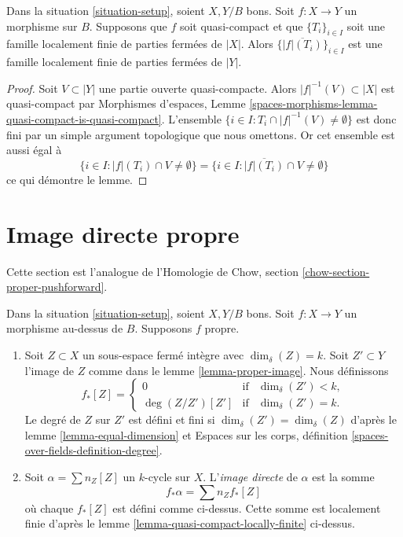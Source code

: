 \begin{lemma}
\label{lemma-quasi-compact-locally-finite}
Dans la situation \ref{situation-setup}, soient $X, Y/B$ bons. Soit $f :
X \to Y$ un morphisme sur $B$. Supposons que $f$ soit quasi-compact et que
$\{T_i\}_{i \in I}$ soit une famille localement finie de parties fermées de
$|X|$. Alors $\{\overline{|f|(T_i)}\}_{i \in I}$ est une famille localement
finie de parties fermées de $|Y|$.
\end{lemma}

\begin{proof}
Soit $V \subset |Y|$ une partie ouverte quasi-compacte. Alors $|f|^{-1}(V)
\subset |X|$ est quasi-compact par Morphismes d'espaces, Lemme
\ref{spaces-morphisms-lemma-quasi-compact-is-quasi-compact}. L’ensemble $\{i
\in I : T_i \cap |f|^{-1}(V) \not = \emptyset \}$ est donc fini par un simple
argument topologique que nous omettons. Or cet ensemble est aussi égal à
$$
\{i \in I : |f|(T_i) \cap V \not = \emptyset \} =
\{i \in I : \overline{|f|(T_i)} \cap V \not = \emptyset \}
$$
ce qui démontre le lemme.
\end{proof}










\section{Image directe propre}
\label{section-proper-pushforward}

\noindent
Cette section est l'analogue de l'Homologie de Chow, section
\ref{chow-section-proper-pushforward}.

\begin{definition}
\label{definition-proper-pushforward}
Dans la situation \ref{situation-setup}, soient $X, Y/B$ bons. Soit $f : X
\to Y$ un morphisme au-dessus de $B$. Supposons $f$ propre.
\begin{enumerate}
\item Soit $Z \subset X$ un sous-espace fermé intègre avec $\dim_\delta(Z) =
k$. Soit $Z' \subset Y$ l'image de $Z$ comme dans le lemme
\ref{lemma-proper-image}. Nous définissons
$$
f_*[Z] =
\left\{
\begin{matrix}
0 & \text{if} & \dim_\delta(Z')< k, \\
\deg(Z/Z') [Z'] & \text{if} & \dim_\delta(Z') = k.
\end{matrix}
\right.
$$
Le degré de $Z$ sur $Z'$ est défini et fini si $\dim_\delta(Z') =
\dim_\delta(Z)$ d'après le lemme \ref{lemma-equal-dimension} et Espaces sur
les corps, définition \ref{spaces-over-fields-definition-degree}.
\item Soit $\alpha = \sum n_Z [Z]$ un $k$-cycle sur $X$. L'{\it image directe}
de $\alpha$ est la somme
$$
f_* \alpha = \sum n_Z f_*[Z]
$$
où chaque $f_*[Z]$ est défini comme ci-dessus. Cette somme est localement finie
d'après le lemme \ref{lemma-quasi-compact-locally-finite} ci-dessus.
\end{enumerate}
\end{definition}

